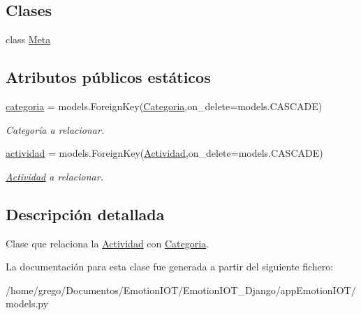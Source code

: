 \subsection*{Clases}
\begin{DoxyCompactItemize}
\item 
class \hyperlink{classappEmotionIOT_1_1models_1_1Categoria__Actividad_1_1Meta}{Meta}
\end{DoxyCompactItemize}
\subsection*{Atributos públicos estáticos}
\begin{DoxyCompactItemize}
\item 
\hyperlink{classappEmotionIOT_1_1models_1_1Categoria__Actividad_a463f3043f94252d32f578d33f25db4ec}{categoria} = models.\+Foreign\+Key(\hyperlink{classappEmotionIOT_1_1models_1_1Categoria}{Categoria},on\+\_\+delete=models.\+C\+A\+S\+C\+A\+DE)\hypertarget{classappEmotionIOT_1_1models_1_1Categoria__Actividad_a463f3043f94252d32f578d33f25db4ec}{}\label{classappEmotionIOT_1_1models_1_1Categoria__Actividad_a463f3043f94252d32f578d33f25db4ec}

\begin{DoxyCompactList}\small\item\em Categoría a relacionar. \end{DoxyCompactList}\item 
\hyperlink{classappEmotionIOT_1_1models_1_1Categoria__Actividad_a274f170aaf89aede3b81f18f75e23dc6}{actividad} = models.\+Foreign\+Key(\hyperlink{classappEmotionIOT_1_1models_1_1Actividad}{Actividad},on\+\_\+delete=models.\+C\+A\+S\+C\+A\+DE)\hypertarget{classappEmotionIOT_1_1models_1_1Categoria__Actividad_a274f170aaf89aede3b81f18f75e23dc6}{}\label{classappEmotionIOT_1_1models_1_1Categoria__Actividad_a274f170aaf89aede3b81f18f75e23dc6}

\begin{DoxyCompactList}\small\item\em \hyperlink{classappEmotionIOT_1_1models_1_1Actividad}{Actividad} a relacionar. \end{DoxyCompactList}\end{DoxyCompactItemize}


\subsection{Descripción detallada}
Clase que relaciona la \hyperlink{classappEmotionIOT_1_1models_1_1Actividad}{Actividad} con \hyperlink{classappEmotionIOT_1_1models_1_1Categoria}{Categoria}. 

La documentación para esta clase fue generada a partir del siguiente fichero\+:\begin{DoxyCompactItemize}
\item 
/home/grego/\+Documentos/\+Emotion\+I\+O\+T/\+Emotion\+I\+O\+T\+\_\+\+Django/app\+Emotion\+I\+O\+T/models.\+py\end{DoxyCompactItemize}

